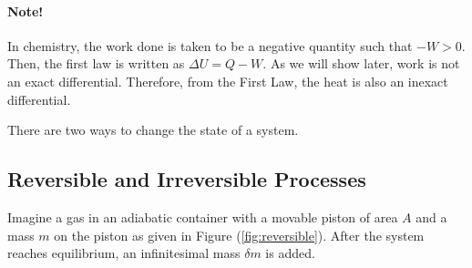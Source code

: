     \paragraph{Note!} In chemistry, the work done is taken to be a negative quantity such that $-W > 0$. Then, the first law is written as $\Delta U = Q - W$. As we will show later, work is not an exact differential. Therefore, from the First Law, the heat is also an inexact differential. 
    
    There are two ways to change the state of a system.

    \subsection{Reversible and Irreversible Processes}
        
        Imagine a gas in an adiabatic container with a movable piston of area $A$ and a mass $m$ on the piston as given in Figure (\ref{fig:reversible}). After the system reaches equilibrium, an infinitesimal mass $\delta m$ is added. 
        
